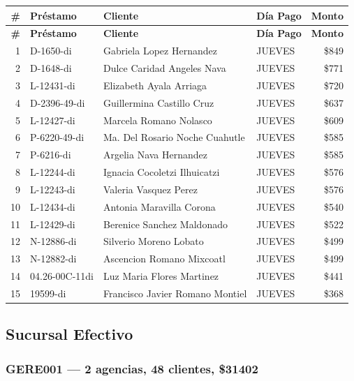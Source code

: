 \documentclass[11pt,a4paper]{article}
\newcommand{\money}[1]{\$\num{#1}}
\begin{document}
\begin{center}
\renewcommand{\arraystretch}{1.1}
\footnotesize
\begin{longtable}{rlp{6.5cm}lr}
\toprule
\textbf{\#} & \textbf{Pr\'estamo} & \textbf{Cliente} & \textbf{D\'ia Pago} & \textbf{Monto} \\
\midrule
\endfirsthead
\toprule
\textbf{\#} & \textbf{Pr\'estamo} & \textbf{Cliente} & \textbf{D\'ia Pago} & \textbf{Monto} \\
\midrule
\endhead
1 & D-1650-di & Gabriela Lopez Hernandez & JUEVES & \money{849} \\
2 & D-1648-di & Dulce Caridad Angeles Nava & JUEVES & \money{771} \\
3 & L-12431-di & Elizabeth Ayala Arriaga & JUEVES & \money{720} \\
4 & D-2396-49-di & Guillermina Castillo Cruz & JUEVES & \money{637} \\
5 & L-12427-di & Marcela Romano Nolasco & JUEVES & \money{609} \\
6 & P-6220-49-di & Ma. Del Rosario Noche Cuahutle & JUEVES & \money{585} \\
7 & P-6216-di & Argelia Nava Hernandez & JUEVES & \money{585} \\
8 & L-12244-di & Ignacia Cocoletzi Ilhuicatzi & JUEVES & \money{576} \\
9 & L-12243-di & Valeria Vasquez Perez & JUEVES & \money{576} \\
10 & L-12434-di & Antonia Maravilla Corona & JUEVES & \money{540} \\
11 & L-12429-di & Berenice Sanchez Maldonado & JUEVES & \money{522} \\
12 & N-12886-di & Silverio Moreno Lobato & JUEVES & \money{499} \\
13 & N-12882-di & Ascencion Romano Mixcoatl & JUEVES & \money{499} \\
14 & 04.26-00C-11di & Luz Maria Flores Martinez & JUEVES & \money{441} \\
15 & 19599-di & Francisco Javier Romano Montiel & JUEVES & \money{368} \\

\bottomrule
\end{longtable}
\end{center}
\newpage
\subsection{Sucursal Efectivo}

\subsubsection{GERE001 --- 2 agencias, 48 clientes, \money{31402}}
\end{document}
